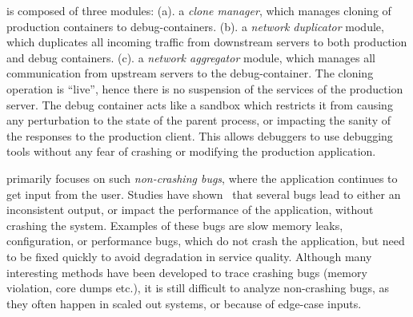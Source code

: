 \parikshan is composed of three modules:
(a). a \textit{clone manager}, which manages cloning of production containers to debug-containers.
(b). a \textit{network duplicator} module, which duplicates all incoming traffic from downstream servers to both production and debug containers.
(c). a \textit{network aggregator} module, which manages all communication from upstream servers to the debug-container.
The cloning operation is ``live'', hence there is no suspension of the services of the production server.
The debug container acts like a sandbox which restricts it from causing any perturbation to the state of the parent process, or impacting the sanity of the responses to the production client. 
This allows debuggers to use debugging tools without any fear of crashing or modifying the production application.

\iffalse
This is done by cloning an application container, and creating two containers: a production container, and a debug container. 
We duplicate incoming traffic from downstream servers to both production and debug containers.
Similarly, we have another module, which replays responses sent from the production container, to the debug container so that it is completely isolated from the network. 
The debugging on the debug-container is done on-the-fly using dynamic instrumentation tools like DTrace~\cite{dtrace}, or iProbe~\cite{iProbe}. 
The cloned debug container acts like a sandbox which restricts it from causing any perturbation to the state of the parent process, or impacting the sanity of the responses to the production client. 
The cloning operation is ``live'', hence there is no suspension of the services of the production server.
\fi

\parikshan primarily focuses on such \emph{non-crashing bugs}, where the application continues to get input from the user.
Studies have shown~\cite{Zhang:2013:ADS:2486788.2486830, liu2005mining, kremenek2007factor} that several bugs lead to either an inconsistent output, or impact the performance of the application, without crashing the system.
Examples of these bugs are slow memory leaks, configuration, or performance bugs, which do not crash the application, but need to be fixed quickly to avoid degradation in service quality. 
Although many interesting methods have been developed to trace crashing bugs (memory violation, core dumps etc.), it is still difficult to analyze non-crashing bugs, as they often happen in scaled out systems, or because of edge-case inputs.

